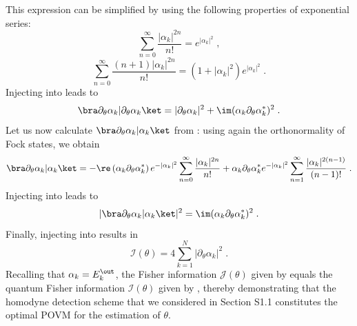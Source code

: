 \documentclass[aps,pra,twocolumn,amsmath,amssymb,superscriptaddress,10pt,nobibnotes]{revtex4-2}
\begin{document}
This expression can be simplified by using the following properties of exponential series:
\begin{equation}
\sum_{n=0}^\infty \frac{|\alpha_k|^{2n}}{n!} = e^{|\alpha_k|^2} \; ,
\label{expseries1}
\end{equation}
\begin{equation}
\sum_{n=0}^\infty \frac{(n+1)|\alpha_k|^{2n}}{n!} = (1+|\alpha_k|^2) e^{|\alpha_k|^2} \; .
\label{expseries2}
\end{equation}
Injecting  into  leads to
\begin{equation}
\bra \partial_\theta \alpha_k | \partial_\theta \alpha_k \ket = | \partial_\theta \alpha_k |^2 + \im (\alpha_k \partial_\theta \alpha_k^*)^2 \; .
\label{first_term_coherent}
\end{equation}
Let us now calculate $\bra \partial_\theta \alpha_k | \alpha_k \ket$ from : using again the orthonormality of Fock states, we obtain
\begin{equation}
\bra \partial_\theta \alpha_k | \alpha_k \ket =  - \re \left( \alpha_k \partial_\theta \alpha_k^* \right)  
e^{- |\alpha_k|^2} \sum_{n=0}^{\infty} \frac{|\alpha_k|^{2n}}{n!} +  \alpha_k \partial_\theta \alpha_k^* e^{- |\alpha_k|^2} \sum_{n=1}^{\infty} \frac{|\alpha_k|^{2(n-1)}}{(n-1)!} \; .
\label{term2_expanded}
\end{equation}
Injecting  into  leads to
\begin{equation}
|\bra \partial_\theta \alpha_k | \alpha_k \ket|^2 = \im (\alpha_k \partial_\theta \alpha_k^*)^2  \; .
\label{second_term_coherent}
\end{equation}
Finally, injecting  into  results in
\begin{equation}
\mathcal{I}(\theta) = 4 \sum_{k=1}^N | \partial_\theta \alpha_k |^2 \; .
\label{fisher_quantum_final}
\end{equation}
Recalling that $\alpha_k=E_k^\out$, the Fisher information $\mathcal{J}(\theta)$ given by  equals the quantum Fisher information $\mathcal{I}(\theta)$ given by , thereby demonstrating that the homodyne detection scheme that we considered in Section S1.1 constitutes the optimal POVM for the estimation of $\theta$.
\end{document}
